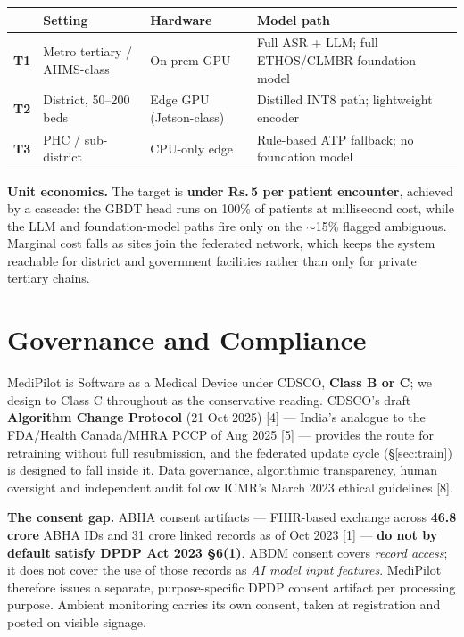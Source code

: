 \documentclass[10pt,a4paper,twocolumn]{article}
\begin{document}
\begin{center}\footnotesize\sffamily
\begin{tabular}{@{}p{0.5cm}p{1.9cm}p{1.6cm}p{3.1cm}@{}}
\toprule
\rowcolor{AccPurple!10}
& \textbf{Setting} & \textbf{Hardware} & \textbf{Model path}\\
\midrule
\textbf{T1} & Metro tertiary / AIIMS-class & On-prem GPU & Full ASR + LLM;
  full ETHOS/CLMBR foundation model\\
\addlinespace[2pt]
\textbf{T2} & District, 50--200 beds & Edge GPU (Jetson-class) & Distilled INT8 path;
  lightweight encoder\\
\addlinespace[2pt]
\textbf{T3} & PHC / sub-district & CPU-only edge & Rule-based ATP fallback;
  no foundation model\\
\bottomrule
\end{tabular}
\end{center}

\vspace{3pt}
\textbf{Unit economics.} The target is \textbf{under Rs.\,5 per patient encounter},
achieved by a cascade: the GBDT head runs on 100\% of patients at millisecond cost,
while the LLM and foundation-model paths fire only on the $\sim$15\% flagged
ambiguous. Marginal cost falls as sites join the federated network, which keeps the
system reachable for district and government facilities rather than only for private
tertiary chains.

\section{Governance and Compliance}
\label{sec:gov}

MediPilot is Software as a Medical Device under CDSCO, \textbf{Class B or C}; we
design to Class C throughout as the conservative reading. CDSCO's draft
\textbf{Algorithm Change Protocol} (21 Oct 2025) [4] --- India's analogue to
the FDA/Health Canada/MHRA PCCP of Aug 2025 [5] --- provides the route for
retraining without full resubmission, and the federated update cycle
(\S\ref{sec:train}) is designed to fall inside it. Data governance, algorithmic
transparency, human oversight and independent audit follow ICMR's March 2023 ethical
guidelines [8].

\begin{tcolorbox}[mpbox,colframe=DeepPurple]
\textbf{The consent gap.} ABHA consent artifacts --- FHIR-based exchange across
\textbf{46.8 crore} ABHA IDs and 31 crore linked records as of Oct 2023
[1] --- \textbf{do not by default satisfy DPDP Act 2023 §6(1)}. ABDM
consent covers \emph{record access}; it does not cover the use of those records as
\emph{AI model input features}. MediPilot therefore issues a separate,
purpose-specific DPDP consent artifact per processing purpose. Ambient monitoring
carries its own consent, taken at registration and posted on visible signage.
\end{tcolorbox}
\end{document}
